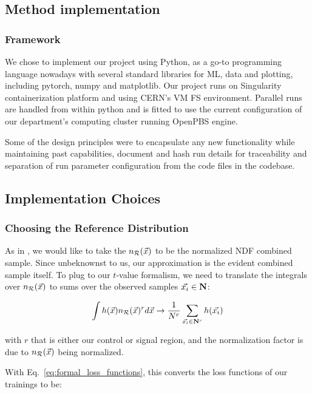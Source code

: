 \documentclass[../../ddppaper2.tex]{subfiles}
\begin{document}
\subsection{Method implementation}

\subsubsection{Framework}

We chose to implement our project using Python, as a go-to programming language nowadays with several standard libraries for ML, data and plotting, including pytorch, numpy and matplotlib. Our project runs on Singularity containerization platform and using CERN's VM FS environment. Parallel runs are handled from within python and is fitted to use the current configuration of our department's computing cluster running OpenPBS engine.

Some of the design principles were to encapsulate any new functionality while maintaining past capabilities, document and hash run details for traceability and separation of run parameter configuration from the code files in the codebase.

\subsection{Implementation Choices}

\subsubsection{Choosing the Reference Distribution}

As in \cite{LastDDPPaper}, we would like to take the $n_{\mathcal{R}}({\vec{{x}}})$ to be the normalized NDF combined sample. Since unbeknownst to us, our approximation is the evident combined sample itself. To plug to our $t$-value formalism, we need to translate the integrals over $n_{\mathcal{R}}({\vec{{x}}})$ to sums over the observed samples ${\vec{{x}_i}} \in {\mathbf{N}}$:

\begin{equation}
    \int h(\vec{{x}}) n_{\mathcal{R}}({\vec{{x}}})^r d\vec{{x}} \to
    \dfrac{1}{N^r}\sum\limits_{{\vec{{x}_i}} \in {\mathbf{N}}^r} h({\vec{{x}_i}})
\end{equation}

\noindent with $r$ that is either our control or signal region, and the normalization factor is due to $n_{\mathcal{R}}({\vec{{x}}})$ being normalized.

With Eq.~\ref{eq:formal_loss_functions}, this converts the loss functions of our trainings to be:
\end{document}
